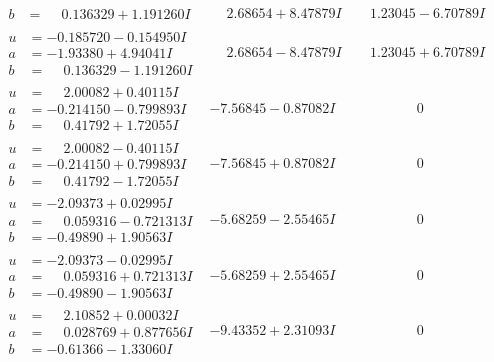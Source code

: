 \documentclass[1p]{elsarticle_modified}
\theoremstyle{definition}
\begin{document}
$$\begin{array}{c|c|c}
\begin{aligned}
b &= \phantom{-}0.136329 + 1.191260 I\end{aligned}
 & \phantom{-}2.68654 + 8.47879 I & \phantom{-}1.23045 - 6.70789 I \\ \hline\begin{aligned}
u &= -0.185720 - 0.154950 I \\
a &= -1.93380 + 4.94041 I \\
b &= \phantom{-}0.136329 - 1.191260 I\end{aligned}
 & \phantom{-}2.68654 - 8.47879 I & \phantom{-}1.23045 + 6.70789 I \\ \hline\begin{aligned}
u &= \phantom{-}2.00082 + 0.40115 I \\
a &= -0.214150 - 0.799893 I \\
b &= \phantom{-}0.41792 + 1.72055 I\end{aligned}
 & -7.56845 - 0.87082 I & \phantom{-0.000000 } 0 \\ \hline\begin{aligned}
u &= \phantom{-}2.00082 - 0.40115 I \\
a &= -0.214150 + 0.799893 I \\
b &= \phantom{-}0.41792 - 1.72055 I\end{aligned}
 & -7.56845 + 0.87082 I & \phantom{-0.000000 } 0 \\ \hline\begin{aligned}
u &= -2.09373 + 0.02995 I \\
a &= \phantom{-}0.059316 - 0.721313 I \\
b &= -0.49890 + 1.90563 I\end{aligned}
 & -5.68259 - 2.55465 I & \phantom{-0.000000 } 0 \\ \hline\begin{aligned}
u &= -2.09373 - 0.02995 I \\
a &= \phantom{-}0.059316 + 0.721313 I \\
b &= -0.49890 - 1.90563 I\end{aligned}
 & -5.68259 + 2.55465 I & \phantom{-0.000000 } 0 \\ \hline\begin{aligned}
u &= \phantom{-}2.10852 + 0.00032 I \\
a &= \phantom{-}0.028769 + 0.877656 I \\
b &= -0.61366 - 1.33060 I\end{aligned}
 & -9.43352 + 2.31093 I & \phantom{-0.000000 } 0 \\ \hline\begin{aligned}

\end{aligned}
\end{array}$$
\end{document}

